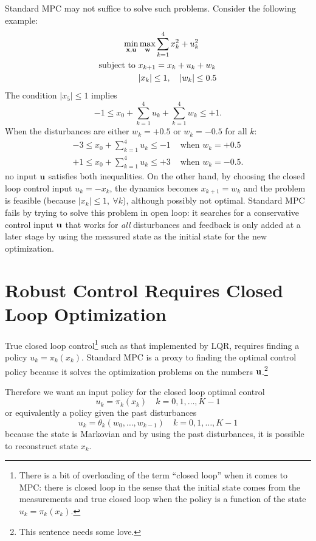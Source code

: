 Standard MPC may not suffice to solve such problems. Consider the following example:
\begin{equation}
  \label{eq:rMPC-unfeasible-problem}
  \begin{aligned}
    \min_{\boldsymbol{\mathrm{x}},\boldsymbol{\mathrm{u}}} & \max_{\boldsymbol{\mathrm{w}}} \sum_{k=1}^{4} x_k^2+u_k^2 \\
    \text{subject to } & x_{k+1} = x_k + u_k + w_k \\
                     & |x_k| \le 1,\quad |w_k| \le 0.5
  \end{aligned}
\end{equation}
The condition $|x_5| \le 1$ implies
\begin{equation*}
  -1\le x_0 + \sum_{k=1}^4 u_k + \sum_{k=1}^4 w_k \le +1.
\end{equation*}
When the disturbances are either $w_k=+0.5$ or $w_k=-0.5$ for all $k$:
\begin{align*}
  -3 \le x_0 + \sum_{k=1}^4 u_k \le -1 & \text{ when } w_k=+0.5 \\
  +1 \le x_0 + \sum_{k=1}^4 u_k \le +3 & \text{ when } w_k=-0.5.
\end{align*}
no input $\boldsymbol{\mathrm{u}}$ satisfies both inequalities. On the other hand, by choosing the closed loop control input $u_k = -x_k$, the dynamics becomes $x_{k+1}=w_k$ and the problem is feasible (because $|x_k|\le 1,\ \forall k$), although possibly not optimal. Standard MPC fails by trying to solve this problem in open loop: it searches for a conservative control input $\boldsymbol{\mathrm{u}}$ that works for \emph{all} disturbances and feedback is only added at a later stage by using the measured state as the initial state for the new optimization.

\section{Robust Control Requires Closed Loop Optimization}
\label{sec:closed-loop-robust-control}

True closed loop control\footnote{There is a bit of overloading of the term ``closed loop'' when it comes to MPC: there is closed loop in the sense that the initial state comes from the measurements and true closed loop when the policy is a function of the state $u_k = \pi_k(x_k)$.} such as that implemented by LQR, requires finding a policy $u_k=\pi_k(x_k)$. Standard MPC is a proxy to finding the optimal control policy because it solves the optimization problems on the numbers $\boldsymbol{\mathrm{u}}$.\footnote{This sentence needs some love.}

Therefore we want an input policy for the closed loop optimal control
\begin{equation*}
  u_k = \pi_k(x_k)\quad k=0,1,\ldots, K-1
\end{equation*}
or equivalently a policy given the past disturbances
\begin{equation*}
  u_k = \theta_k(w_0,\ldots,w_{k-1})\quad k=0,1,\ldots, K-1
\end{equation*}
because the state is Markovian and by using the past disturbances, it is possible to reconstruct state $x_k$.

